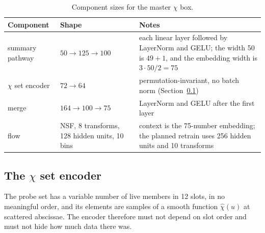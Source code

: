 \documentclass[10pt,a4paper]{article}
\begin{document}
\begin{table}[h]
\centering
\small
\begin{tabularx}{\textwidth}{@{}L{3.6cm} L{4.1cm} Y@{}}
\toprule
Component & Shape & Notes \\
\midrule
summary pathway & $50\to125\to100$ & each linear layer followed by LayerNorm and GELU; the width 50 is
  $49+1$, and the embedding width is $3\cdot50/2=75$ \\
$\chi$ set encoder & $72\to64$ & permutation-invariant, no batch norm (Section~\ref{sec:chienc}) \\
merge & $164\to100\to75$ & LayerNorm and GELU after the first layer \\
flow & NSF, 8 transforms, 128 hidden units, 10 bins & context is the 75-number embedding; the planned retrain uses
  256 hidden units and 10 transforms \\
\bottomrule
\end{tabularx}
\caption{Component sizes for the master $\chi$ box.}
\label{tab:net}
\end{table}

\subsection{The \texorpdfstring{$\chi$}{chi} set encoder}
\label{sec:chienc}

The probe set has a variable number of live members in 12 slots, in no meaningful order, and its elements are
samples of a smooth function $\hat\chi(u)$ at scattered abscissae. The encoder therefore must not depend on slot
order and must not hide how much data there was.
\end{document}
